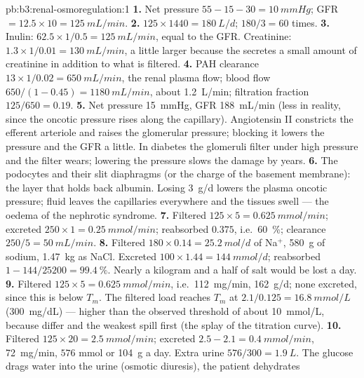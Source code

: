 \begin{solution}{pb:b3:renal-osmoregulation:1}
\textbf{1.} Net pressure $55 - 15 - 30 = \qty{10}{mmHg}$; GFR $= 12.5
\times 10 = \qty{125}{mL/min}$.
\textbf{2.} $125\times 1440 = \qty{180}{L/d}$; $180/3 = 60$ times.
\textbf{3.} Inulin: $62.5\times 1/0.5 = \qty{125}{mL/min}$, equal to the
GFR. Creatinine: $1.3\times 1/0.01 = \qty{130}{mL/min}$, a little
larger because the  secretes a small amount of
creatinine in addition to what is filtered.
\textbf{4.} PAH clearance $13\times 1/0.02 = \qty{650}{mL/min}$, the
renal plasma flow; blood flow $650/(1 - 0.45) = \qty{1180}{mL/min}$,
about \qty{1.2}{L/min}; filtration fraction $125/650 = 0.19$.
\textbf{5.} Net pressure \qty{15}{mmHg}, GFR \qty{188}{mL/min} (less in
reality, since the oncotic pressure rises along the capillary).
Angiotensin II constricts the efferent arteriole and raises the
glomerular pressure; blocking it lowers the pressure and the GFR a
little. In diabetes the glomeruli filter under high pressure and the
filter wears; lowering the pressure slows the damage by years.
\textbf{6.} The podocytes and their slit diaphragms (or the charge of
the basement membrane): the layer that holds back albumin. Losing
\qty{3}{g/d} lowers the plasma oncotic pressure; fluid leaves the
capillaries everywhere and the tissues swell --- the oedema of the
nephrotic syndrome.
\textbf{7.} Filtered $125\times 5 = \qty{0.625}{mmol/min}$; excreted
$250\times 1 = \qty{0.25}{mmol/min}$; reabsorbed $0.375$, i.e.\
\qty{60}{\%}; clearance $250/5 = \qty{50}{mL/min}$.
\textbf{8.} Filtered $180\times 0.14 = \qty{25.2}{mol/d}$ of Na$^{+}$,
\qty{580}{g} of sodium, \qty{1.47}{kg} as NaCl. Excreted $100\times 1.44
= \qty{144}{mmol/d}$; reabsorbed $1 - 144/\num{25200} = \qty{99.4}{\%}$.
Nearly a kilogram and a half of salt would be lost a day.
\textbf{9.} Filtered $125\times 5 = \qty{0.625}{mmol/min}$, i.e.\
\qty{112}{mg/min}, \qty{162}{g/d}; none excreted, since this is below
$T_{m}$. The filtered load reaches $T_{m}$ at $2.1/0.125 =
\qty{16.8}{mmol/L}$ (\qty{300}{mg/dL}) --- higher than the observed
threshold of about \qty{10}{mmol/L}, because  differ and the
weakest spill first (the splay of the titration curve).
\textbf{10.} Filtered $125\times 20 = \qty{2.5}{mmol/min}$; excreted
$2.5 - 2.1 = \qty{0.4}{mmol/min}$, \qty{72}{mg/min}, $576$ mmol or
\qty{104}{g} a day. Extra urine $576/300 = \qty{1.9}{L}$. The glucose
drags water into the urine (osmotic diuresis), the patient dehydrates

\end{solution}
